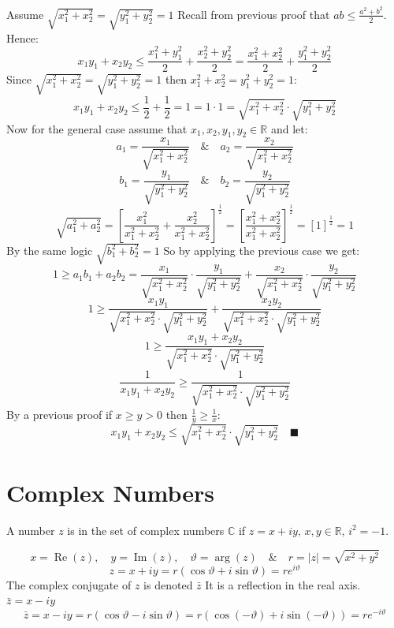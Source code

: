 \documentclass{article}
\renewcommand{\Re}{\operatorname{Re}}
\renewcommand{\Im}{\operatorname{Im}}
\newcommand{\bb}[1]{\mathbb{#1}}
\begin{document}
Assume \(\sqrt{x_1^2+x_2^2}=\sqrt{y_1^2+y_2^2}=1\)
Recall from previous proof that \(ab\le \frac{a^2+b^2}{2}\). Hence:
\[x_1y_1+x_2y_2\le\frac{x_1^2+y_1^2}{2}+\frac{x_2^2+y_2^2}{2}=\frac{x_1^2+x_2^2}{2}+\frac{y_1^2+y_2^2}{2}\]
Since \(\sqrt{x_1^2+x_2^2}=\sqrt{y_1^2+y_2^2}=1\) then \(x_1^2+x_2^2=y_1^2+y_2^2=1\):
\[x_1y_1+x_2y_2\le\frac 12+\frac 12=1=1\cdot1=\sqrt{x_1^2+x_2^2}\cdot\sqrt{y_1^2+y_2^2}\]
Now for the general case assume that \(x_1,x_2,y_1,y_2\in\bb R\) and let:
\[a_1=\frac{x_1}{\sqrt{x_1^2+x_2^2}}\quad\&\quad a_2=\frac{x_2}{\sqrt{x_1^2+x_2^2}}\]
\[b_1=\frac{y_1}{\sqrt{y_1^2+y_2^2}}\quad\&\quad b_2=\frac{y_2}{\sqrt{y_1^2+y_2^2}}\]
\[\sqrt{a_1^2+a_2^2}=\left[\frac{x_1^2}{x_1^2+x_2^2}+\frac{x_2^2}{x_1^2+x_2^2}\right]^{\frac 12}=\left[\frac{x_1^2+x_2^2}{x_1^2+x_2^2}\right]^{\frac 12}=[1]^{\frac 12}=1\]
By the same logic \(\sqrt{b_1^2+b_2^2}=1\)
So by applying the previous case we get:
\[1\ge a_1b_1+a_2b_2=\frac{x_1}{\sqrt{x_1^2+x_2^2}}\cdot\frac{y_1}{\sqrt{y_1^2+y_2^2}}+\frac{x_2}{\sqrt{x_1^2+x_2^2}}\cdot\frac{y_2}{\sqrt{y_1^2+y_2^2}}\]
\[1\ge \frac{x_1y_1}{\sqrt{x_1^2+x_2^2}\cdot\sqrt{y_1^2+y_2^2}}+\frac{x_2y_2}{\sqrt{x_1^2+x_2^2}\cdot\sqrt{y_1^2+y_2^2}}\]
\[1\ge \frac{x_1y_1+x_2y_2}{\sqrt{x_1^2+x_2^2}\cdot\sqrt{y_1^2+y_2^2}}\]
\[\frac{1}{x_1y_1+x_2y_2}\ge \frac{1}{\sqrt{x_1^2+x_2^2}\cdot\sqrt{y_1^2+y_2^2}}\]
By a previous proof if \(x\ge y>0\) then \(\frac 1y\ge\frac 1x\):
\[x_1y_1+x_2y_2\le\sqrt{x_1^2+x_2^2}\cdot\sqrt{y_1^2+y_2^2}\quad\blacksquare\]

\section{Complex Numbers}

A number \(z\) is in the set of complex numbers \(\bb C\) if \(z=x+iy,\,x,y\in\bb R,\,i^2=-1\).

\begin{center}
\end{center}

\[x=\Re(z),\quad y=\Im(z),\quad\vartheta=\arg(z)\quad\&\quad r=|z|=\sqrt{x^2+y^2}\]
\[z=x+iy=r(\cos\vartheta+i\sin\vartheta)=re^{i\vartheta}\]
The complex conjugate of \(z\) is denoted \(\bar z\) It is a reflection in the real axis. \(\bar z=x-iy\)
\[\bar z=x-iy=r(\cos\vartheta-i\sin\vartheta)=r(\cos(-\vartheta)+i\sin(-\vartheta))=re^{-i\vartheta}\]
\end{document}
